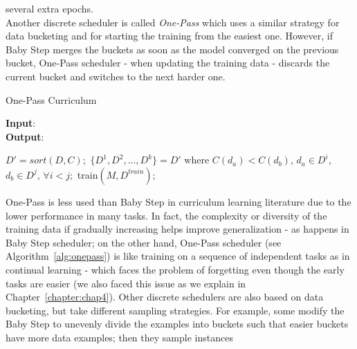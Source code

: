 several extra epochs. \\
Another discrete scheduler is called \textit{One-Pass} which uses a similar strategy for data bucketing and for starting the training from the easiest one.
However, if Baby Step merges the buckets as soon as the model converged on the previous bucket, One-Pass scheduler - when updating the training data - discards the current bucket
and switches to the next harder one. 
\begin{algorithm}
    \caption{One-Pass Curriculum \cite{cirik2016visualizing}}\label{alg:onepass}
    \hspace*{\algorithmicindent} \textbf{Input}: \\
    \hspace*{\algorithmicindent} \textbf{Output}: 
    \begin{algorithmic}[1]
    \State $D'= sort(D,C);$
    \State $\lbrace D^1, D^2,...,D^k \rbrace = D'$ where $C(d_a) < C(d_b)$, $d_a\in D^i$, $d_b\in D^j$, $\forall i<j;$
        \State train$(M, D^{train});$
        \EndWhile
    \EndFor
    \end{algorithmic}
\end{algorithm}
\newline
One-Pass is less used than Baby Step in curriculum learning literature due to the lower performance in many tasks.
In fact, the complexity or diversity of the training data if gradually increasing
helps improve generalization - as happens in Baby Step scheduler; on the other hand,
One-Pass scheduler (see Algorithm~\ref{alg:onepass}) is like training on a sequence of independent tasks as in 
continual learning - which faces the problem of forgetting even though the early tasks are easier 
(we also faced this issue as we explain in Chapter~\ref{chapter:chap4}).
Other discrete schedulers are also based on data bucketing, but take 
different sampling strategies. For example, some \cite{kocmi2017curriculum} modify the Baby Step to unevenly divide 
the examples into buckets such that easier buckets have more data examples; then they sample instances

